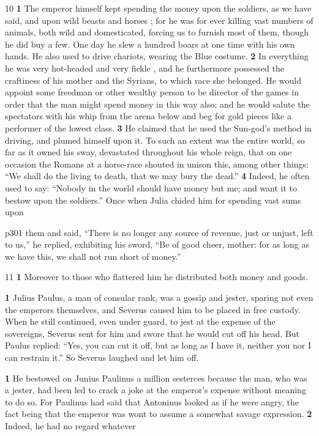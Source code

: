 10
\textbf{1} The emperor himself kept spending the money upon the soldiers, as we have said, and upon wild beasts and horses ; for he was for ever killing vast numbers of animals, both wild and domesticated, forcing us to furnish most of them, though he did buy a few. One day he slew a hundred boars at one time with his own hands. He also used to drive chariots, wearing the Blue costume. \textbf{2} In everything he was very hot-headed and very fickle , and he furthermore possessed the craftiness of his mother and the Syrians, to which race she belonged. He would appoint some freedman or other wealthy person to be director of the games in order that the man might spend money in this way also; and he would salute the spectators with his whip from the arena below and beg for gold pieces like a performer of the lowest class. \textbf{3} He claimed that he used the Sun-god's method in driving, and plumed himself upon it. To such an extent was the entire world, so far as it owned his sway, devastated throughout his whole reign, that on one occasion the Romans at a horse-race shouted in unison this, among other things: ``We shall do the living to death, that we may bury the dead.'' \textbf{4} Indeed, he often used to say: ``Nobody in the world should have money but me; and want it to bestow upon the soldiers.'' Once when Julia chided him for spending vast sums upon

p301 them and said, ``There is no longer any source of revenue, just or unjust, left to us,'' he replied, exhibiting his sword, ``Be of good cheer, mother: for as long as we have this, we shall not run short of money.''

11
\textbf{1} Moreover to those who flattered him he distributed both money and goods.

\textbf{1} Julius Paulus, a man of consular rank, was a gossip and jester, sparing not even the emperors themselves, and Severus caused him to be placed in free custody. When he still continued, even under guard, to jest at the expense of the sovereigns, Severus sent for him and swore that he would cut off his head. But Paulus replied: ``Yes, you can cut it off, but as long as I have it, neither you nor I can restrain it.'' So Severus laughed and let him off.

\textbf{1} He bestowed on Junius Paulinus a million sesterces because the man, who was a jester, had been led to crack a joke at the emperor's expense without meaning to do so. For Paulinus had said that Antoninus looked as if he were angry, the fact being that the emperor was wont to assume a somewhat savage expression. \textbf{2} Indeed, he had no regard whatever

